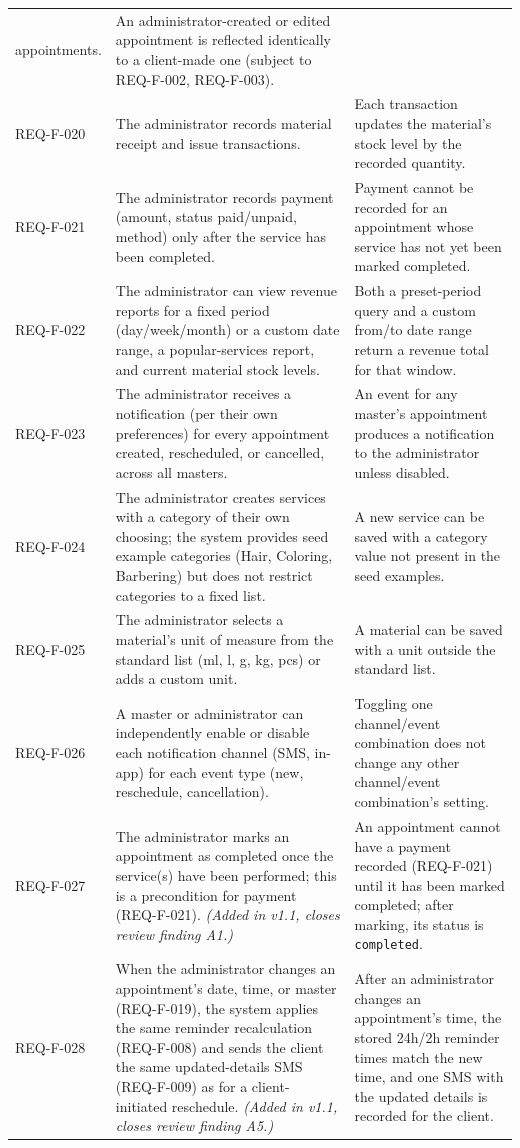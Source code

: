 \documentclass[11pt,a4paper]{article}
\begin{document}
\begin{longtable}{L{1.9cm}L{6.4cm}L{6.2cm}}
  appointments. & An administrator-created or edited appointment is
  reflected identically to a client-made one (subject to REQ-F-002,
  REQ-F-003). \\
REQ-F-020 & The administrator records material receipt and issue
  transactions. & Each transaction updates the material's stock level by
  the recorded quantity. \\
REQ-F-021 & The administrator records payment (amount, status paid/unpaid,
  method) only after the service has been completed. & Payment cannot be
  recorded for an appointment whose service has not yet been marked
  completed. \\
REQ-F-022 & The administrator can view revenue reports for a fixed period
  (day/week/month) or a custom date range, a popular-services report, and
  current material stock levels. & Both a preset-period query and a custom
  from/to date range return a revenue total for that window. \\
REQ-F-023 & The administrator receives a notification (per their own
  preferences) for every appointment created, rescheduled, or cancelled,
  across all masters. & An event for any master's appointment produces a
  notification to the administrator unless disabled. \\
REQ-F-024 & The administrator creates services with a category of their own
  choosing; the system provides seed example categories (Hair, Coloring,
  Barbering) but does not restrict categories to a fixed list. & A new
  service can be saved with a category value not present in the seed
  examples. \\
REQ-F-025 & The administrator selects a material's unit of measure from the
  standard list (ml, l, g, kg, pcs) or adds a custom unit. & A material can
  be saved with a unit outside the standard list. \\
REQ-F-026 & A master or administrator can independently enable or disable
  each notification channel (SMS, in-app) for each event type (new,
  reschedule, cancellation). & Toggling one channel/event combination does
  not change any other channel/event combination's setting. \\
REQ-F-027 & The administrator marks an appointment as completed once the
  service(s) have been performed; this is a precondition for payment
  (REQ-F-021). \emph{(Added in v1.1, closes review finding A1.)} & An
  appointment cannot have a payment recorded (REQ-F-021) until it has been
  marked completed; after marking, its status is \texttt{completed}. \\
REQ-F-028 & When the administrator changes an appointment's date, time, or
  master (REQ-F-019), the system applies the same reminder recalculation
  (REQ-F-008) and sends the client the same updated-details SMS
  (REQ-F-009) as for a client-initiated reschedule. \emph{(Added in v1.1,
  closes review finding A5.)} & After an administrator changes an
  appointment's time, the stored 24h/2h reminder times match the new time,
  and one SMS with the updated details is recorded for the client. \\
\bottomrule
\end{longtable}
\end{document}
